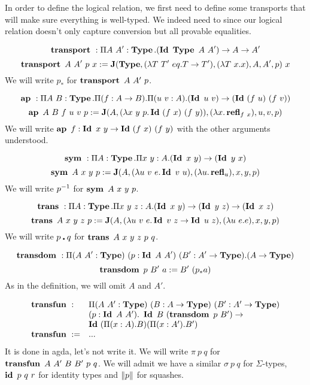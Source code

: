 \documentclass[a4paper,english]{lipics-utf8x}
\begin{document}

  In order to define the logical relation, we first need to define some
  transports that will make sure everything is well-typed. We indeed need to
  since our logical relation doesn't only capture conversion but all provable
  equalities.

  \[\operatorname{\mathbf{transport}~} : \Pi A\ A' : \operatorname{\mathbf{Type}}.(\operatorname{\mathbf{Id}~} \operatorname{\mathbf{Type}}\ A\ A') \to A \to A'\]
  \[\transport A\ A'\ p\ x := \J(\Type, (\lambda T\ T'\ eq. T \to T'),
  (\lambda T\ x. x), A, A', p)\ x\]
  We will write $p_*$ for $\operatorname{\mathbf{transport}~} A\ A'\ p$.

  \[\operatorname{\mathbf{ap}~} : \Pi A\ B : \operatorname{\mathbf{Type}}. \Pi (f : A \to B). \Pi (u\ v : A).
    (\operatorname{\mathbf{Id}~} u\ v) \to (\operatorname{\mathbf{Id}~} (f\ u)\ (f\ v))\]
  \[\operatorname{\mathbf{ap}~} A\ B\ f\ u\ v\ p := \operatorname{\mathbf{J}}(A, (\lambda x\ y\ p. \operatorname{\mathbf{Id}~} (f\ x)\ (f\ y)),
  (\lambda x. \operatorname{\mathbf{refl}}_{f\ x}), u, v, p)\]
  We will write $\operatorname{\mathbf{ap}~} f : \operatorname{\mathbf{Id}~} x\ y \to \operatorname{\mathbf{Id}~} (f\ x)\ (f\ y)$ with the other
  arguments understood.

  \[\operatorname{\mathbf{sym}~} : \Pi A : \operatorname{\mathbf{Type}}. \Pi x\ y : A. (\operatorname{\mathbf{Id}~} x\ y) \to (\operatorname{\mathbf{Id}~} y\ x)\]
  \[\sym A\ x\ y\ p := \J(A, (\lambda u\ v\ e. \Id v\ u), (\lambda u. \refl_u),
  x,y,p)\]
  We will write $p^{-1}$ for $\operatorname{\mathbf{sym}~} A\ x\ y\ p$.

  \[\operatorname{\mathbf{trans}~} : \Pi A : \operatorname{\mathbf{Type}}. \Pi x\ y\ z : A.
  (\operatorname{\mathbf{Id}~} x\ y) \to (\operatorname{\mathbf{Id}~} y\ z) \to (\operatorname{\mathbf{Id}~} x\ z)\]
  \[
    \operatorname{\mathbf{trans}~} A\ x\ y\ z\ p := \operatorname{\mathbf{J}}(A, (\lambda u\ v\ e. \operatorname{\mathbf{Id}~} v\ z \to \operatorname{\mathbf{Id}~} u\ z),
    (\lambda u\ e. e), x, y, p)
  \]
  We will write $p \centerdot q$ for $\operatorname{\mathbf{trans}~} A\ x\ y\ z\ p\ q$.

  \[
    \operatorname{\mathbf{transdom}~} : \Pi (A\ A' : \operatorname{\mathbf{Type}})\ (p : \operatorname{\mathbf{Id}~} A\ A')\ (B' : A' \to \operatorname{\mathbf{Type}}).
                (A \to \operatorname{\mathbf{Type}})
  \]
  \[
    \operatorname{\mathbf{transdom}~} p\ B'\ a := B'\ (p_* a)
  \]
  As in the definition, we will omit $A$ and $A'$.

  \[
  \begin{array}{l@{\quad}l}
    \transfun :~& \Pi (A\ A' : \Type)\ (B : A \to \Type)\ (B' : A' \to \Type) \\
                & (p : \Id A\ A').\ \Id B\ (\transdom p\ B') \to \\
                & \Id (\Pi (x:A).B) (\Pi (x:A').B') \\
    \transfun :=& ...
  \end{array}
  \]
  It is done in agda, let's not write it.
  We will write $\pi\ p\ q$ for $\operatorname{\mathbf{transfun}~} A\ A'\ B\ B'\ p\ q$.
  We will admit we have a similar $\sigma\ p\ q$ for $\Sigma$-types,
  $\operatorname{\mathbf{id}}\ p\ q\ r$ for identity types and $\|p\|$ for squashes.

\end{document}
